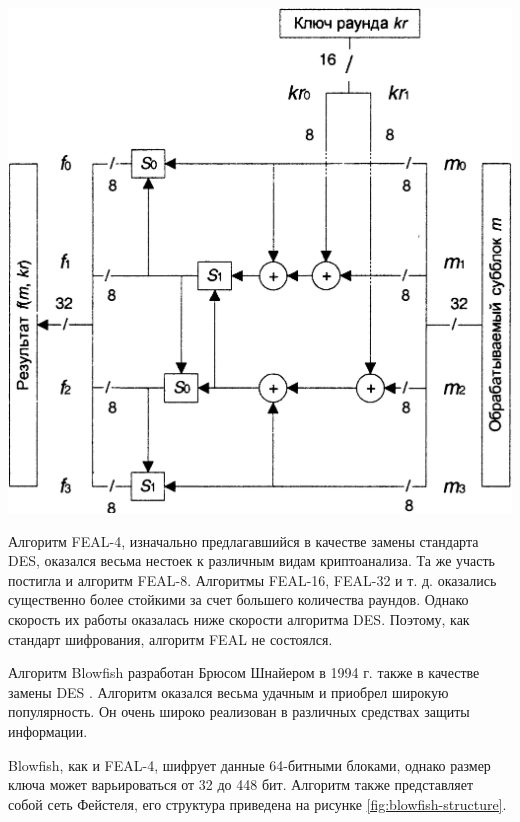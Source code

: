 \noindent
\begin{minipage}{\linewidth}
  \centering
  \vspace{3.5mm}
  \includegraphics[scale=0.2]{./pics/feal-nx-f.png}
  \label{fig:feal-nx-f}
  \vspace{3.5mm}
\end{minipage}

Алгоритм FEAL-4, изначально предлагавшийся в качестве замены стандарта DES,
оказался весьма нестоек к различным видам криптоанализа. Та же участь постигла
и алгоритм FEAL-8. Алгоритмы FEAL-16, FEAL-32 и т. д. оказались существенно
более стойкими за счет большего количества раундов. Однако скорость их работы
оказалась ниже скорости алгоритма DES. Поэтому, как стандарт шифрования,
алгоритм FEAL не состоялся.

Алгоритм Blowfish разработан Брюсом Шнайером в 1994 г. также в качестве
замены DES \cite[стр. 118]{panasenko}.
Алгоритм оказался весьма удачным и приобрел широкую популярность. Он очень широко реализован в различных
средствах защиты информации.

Blowfish, как и FEAL-4, шифрует данные 64-битными блоками, однако размер
ключа может варьироваться от 32 до 448 бит. Алгоритм также представляет
собой сеть Фейстеля, его структура приведена на рисунке \ref{fig:blowfish-structure}.

